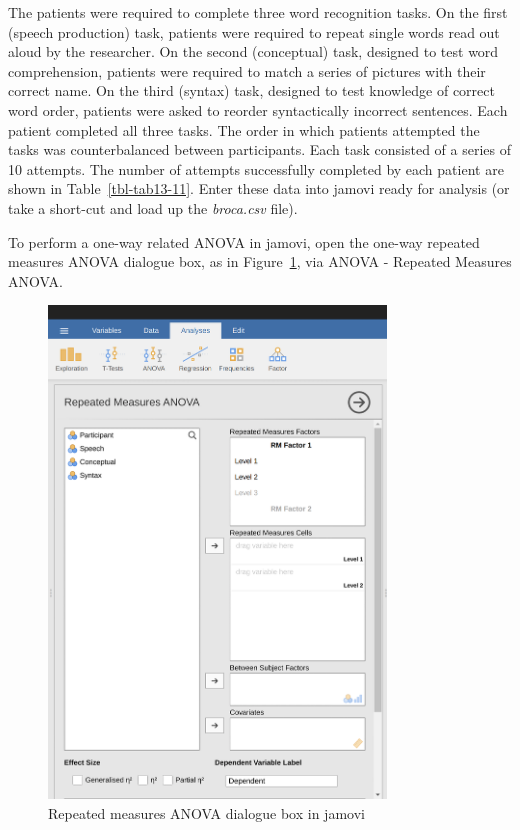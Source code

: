 \documentclass[
  a4paper,
]{book}
\begin{document}
The patients were required to complete three word recognition tasks. On
the first (speech production) task, patients were required to repeat
single words read out aloud by the researcher. On the second
(conceptual) task, designed to test word comprehension, patients were
required to match a series of pictures with their correct name. On the
third (syntax) task, designed to test knowledge of correct word order,
patients were asked to reorder syntactically incorrect sentences. Each
patient completed all three tasks. The order in which patients attempted
the tasks was counterbalanced between participants. Each task consisted
of a series of 10 attempts. The number of attempts successfully
completed by each patient are shown in Table~\ref{tbl-tab13-11}. Enter
these data into jamovi ready for analysis (or take a short-cut and load
up the \emph{broca.csv} file).

To perform a one-way related ANOVA in jamovi, open the one-way repeated
measures ANOVA dialogue box, as in Figure~\ref{fig-fig13-9}, via ANOVA -
Repeated Measures ANOVA.

\begin{figure}

{\centering \includegraphics[width=0.8\textwidth,height=\textheight]{images/fig13-9.png}

}

\caption{\label{fig-fig13-9}Repeated measures ANOVA dialogue box in
jamovi}

\end{figure}
\end{document}
